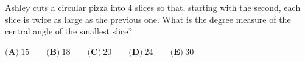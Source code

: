 Ashley cuts a circular pizza into $4$ slices so that, starting with the second, each slice is twice as large as the previous one. What is the degree measure of the central angle of the smallest slice?

$\textbf{(A)}\ 15\qquad\textbf{(B)}\ 18\qquad\textbf{(C)}\ 20\qquad\textbf{(D)}\ 24\qquad\textbf{(E)}\ 30$
